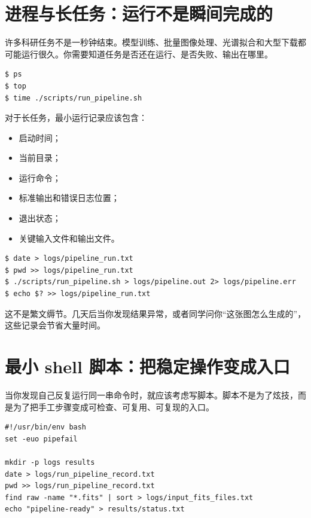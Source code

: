 \section{进程与长任务：运行不是瞬间完成的}

许多科研任务不是一秒钟结束。模型训练、批量图像处理、光谱拟合和大型下载都可能运行很久。你需要知道任务是否还在运行、是否失败、输出在哪里。

\begin{examplebox}[查看进程和运行时间]
\begin{lstlisting}[style=terminal]
$ ps
$ top
$ time ./scripts/run_pipeline.sh
\end{lstlisting}
\end{examplebox}

对于长任务，最小运行记录应该包含：

\begin{itemize}
    \item 启动时间；
    \item 当前目录；
    \item 运行命令；
    \item 标准输出和错误日志位置；
    \item 退出状态；
    \item 关键输入文件和输出文件。
\end{itemize}

\begin{examplebox}[长任务的最小记录方式]
\begin{lstlisting}[style=terminal]
$ date > logs/pipeline_run.txt
$ pwd >> logs/pipeline_run.txt
$ ./scripts/run_pipeline.sh > logs/pipeline.out 2> logs/pipeline.err
$ echo $? >> logs/pipeline_run.txt
\end{lstlisting}
\end{examplebox}

这不是繁文缛节。几天后当你发现结果异常，或者同学问你“这张图怎么生成的”，这些记录会节省大量时间。

\section{最小 shell 脚本：把稳定操作变成入口}

当你发现自己反复运行同一串命令时，就应该考虑写脚本。脚本不是为了炫技，而是为了把手工步骤变成可检查、可复用、可复现的入口。

\begin{examplebox}[最小 shell 脚本]
\begin{lstlisting}[style=terminal]
#!/usr/bin/env bash
set -euo pipefail

mkdir -p logs results
date > logs/run_pipeline_record.txt
pwd >> logs/run_pipeline_record.txt
find raw -name "*.fits" | sort > logs/input_fits_files.txt
echo "pipeline-ready" > results/status.txt
\end{lstlisting}
\end{examplebox}

